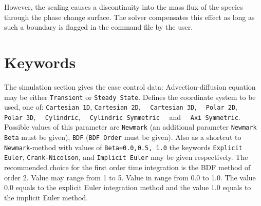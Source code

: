 However, the scaling causes a discontinuity into the mass flux of the
species through the phase change surface. The solver compensates this
effect as long as such a boundary is flagged in the command file by
the user.


\section{Keywords} 

\sifbegin
{}
The simulation section gives the case control data:
\sifbegin
{} Advection-diffusion equation may be either 
{\tt Transient} or {\tt Steady State}.
 Defines the coordinate system to be used, one of:
{\tt Cartesian 1D}, {\tt Cartesian 2D},~~ {\tt Cartesian 3D},~~ {\tt Polar 2D},~~
 {\tt Polar 3D},~~ {\tt Cy\-lin\-dric},~~ {\tt Cylindric Symmetric}
~~and~~ {\tt Axi Symmetric}.
Possible values of this parameter are {\tt Newmark} (an additional
parameter {\tt Newmark Beta} must be given), {\tt BDF} ({\tt BDF Order} must be given). Also as a
shortcut to {\tt Newmark}-method with values of {\tt Beta=0.0,0.5, 1.0} the keywords 
{\tt Explicit Euler}, {\tt Crank-Nicolson}, and {\tt Implicit Euler} may be given respectively.
The recommended choice for the first order time integration is the BDF method of order 2.
Value may range from 1 to 5.
 Value in range from 0.0 to 1.0. The value 0.0 equals to
the explicit Euler integration method and the value 1.0 equals to the implicit Euler method. 
\sifend

